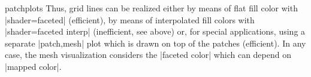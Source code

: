 \begin{pgfplotslibrary}{patchplots}
	Thus, grid lines can be realized either by means of flat fill color with |shader=faceted| (efficient), by means of interpolated fill colors with |shader=faceted interp| (inefficient, see above) or, for special applications, using a separate |patch,mesh| plot which is drawn on top of the patches (efficient). In any case, the mesh visualization considers the |faceted color| which can depend on |mapped color|.

\end{pgfplotslibrary}
